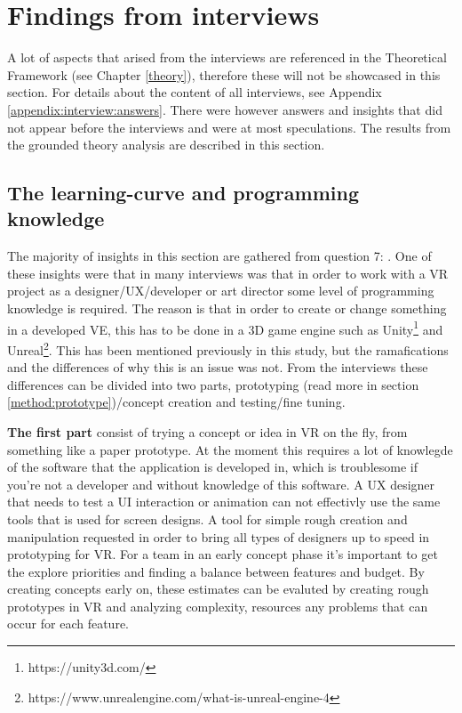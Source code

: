 \section{Findings from interviews}
\label{result:interviews}
A lot of aspects that arised from the interviews are referenced in the Theoretical Framework (see Chapter \ref{theory}), therefore these will not be showcased in this section. For details about the content of all interviews, see Appendix \ref{appendix:interview:answers}.  There were however answers and insights that did not appear before the interviews and were at most speculations. The results from the grounded theory analysis are described in this section.
\subsection{The learning-curve and programming knowledge}
\label{result:interviews:learningcurve}
The majority of insights in this section are gathered from question 7: . One of these insights were that in many interviews was that in order to work with a VR project as a designer/UX/developer or art director some level of programming knowledge is required. The reason is that in order to create or change something in a developed VE, this has to be done in a 3D game engine such as Unity\footnote{https://unity3d.com/} and Unreal\footnote{https://www.unrealengine.com/what-is-unreal-engine-4}. This has been mentioned previously in this study, but the ramafications and the differences of why this is an issue was not. From the interviews these differences can be divided into two parts, prototyping (read more in section \ref{method:prototype})/concept creation and testing/fine tuning.

\textbf{The first part} consist of trying a concept or idea in VR on the fly, from something like a paper prototype. At the moment this requires a lot of knowlegde of the software that the application is developed in, which is troublesome if you're not a developer and without knowledge of this software. A UX designer that needs to test a UI interaction or animation can not effectivly use the same tools that is used for  screen designs. A tool for simple rough creation and manipulation requested in order to bring all types of designers up to speed in prototyping for VR. For a team in an early concept phase it's important to get the explore priorities and finding a balance between features and budget. By creating concepts early on, these estimates can be evaluted by creating rough prototypes in VR and analyzing complexity, resources any problems that can occur for each feature.

